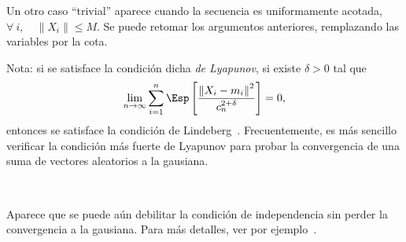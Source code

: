 Un otro caso  ``trivial'' aparece cuando la secuencia  es uniformamente acotada,
\ie \  $\forall \: i, \quad  \| X_i \| \le  M$. Se puede  retomar los argumentos
anteriores, remplazando las variables por la cota.

Nota: si  se satisface  la condici\'on  dicha {\it de  Lyapunov}, \ie  si existe
$\delta > 0$ tal que
%
\[
\lim_{n   \to  \infty}   \sum_{i=1}^n   \Esp\left[  \frac{\left\|   X_i  -   m_i
    \right\|^2}{c_n^{2+\delta}} \right] = 0,
\]
%
entonces         se          satisface         la         condici\'on         de
Lindeberg~\cite{AshDol99}.  Frecuentemente,  es   m\'as  sencillo  verificar  la
condici\'on m\'as fuerte de Lyapunov para  probar la convergencia de una suma de
vectores aleatorios a la gausiana.

\

Aparece que se puede a\'un  debilitar la condici\'on de independencia sin perder
la   convergencia    a   la   gausiana.    Para   m\'as   detalles,    ver   por
ejemplo~\cite[Sec.~6.4]{BroDav87}.
